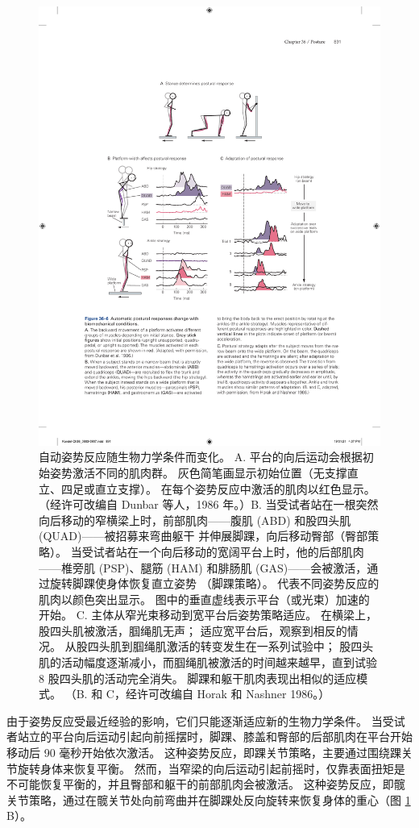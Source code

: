 \begin{figure}[htbp]
	\centering
	\includegraphics[width=0.8\linewidth]{chap36/fig_36_6}
	\caption{自动姿势反应随生物力学条件而变化。 A. 平台的向后运动会根据初始姿势激活不同的肌肉群。 灰色简笔画显示初始位置（无支撑直立、四足或直立支撑）。 在每个姿势反应中激活的肌肉以红色显示。 （经许可改编自 Dunbar 等人，1986 年。）B. 当受试者站在一根突然向后移动的窄横梁上时，前部肌肉——腹肌 (ABD) 和股四头肌 (QUAD)——被招募来弯曲躯干 并伸展脚踝，向后移动臀部（臀部策略）。 当受试者站在一个向后移动的宽阔平台上时，他的后部肌肉——椎旁肌 (PSP)、腿筋 (HAM) 和腓肠肌 (GAS)——会被激活，通过旋转脚踝使身体恢复直立姿势 （脚踝策略）。 代表不同姿势反应的肌肉以颜色突出显示。 图中的垂直虚线表示平台（或光束）加速的开始。 C. 主体从窄光束移动到宽平台后姿势策略适应。 在横梁上，股四头肌被激活，腘绳肌无声； 适应宽平台后，观察到相反的情况。 从股四头肌到腘绳肌激活的转变发生在一系列试验中； 股四头肌的活动幅度逐渐减小，而腘绳肌被激活的时间越来越早，直到试验 8 股四头肌的活动完全消失。 脚踝和躯干肌肉表现出相似的适应模式。 （B. 和 C，经许可改编自 Horak 和 Nashner 1986。）}
	\label{fig:36_6}
\end{figure}


由于姿势反应受最近经验的影响，它们只能逐渐适应新的生物力学条件。 当受试者站立的平台向后运动引起向前摇摆时，脚踝、膝盖和臀部的后部肌肉在平台开始移动后 90 毫秒开始依次激活。 这种姿势反应，即踝关节策略，主要通过围绕踝关节旋转身体来恢复平衡。 然而，当窄梁的向后运动引起前摇时，仅靠表面扭矩是不可能恢复平衡的，并且臀部和躯干的前部肌肉会被激活。 这种姿势反应，即髋关节策略，通过在髋关节处向前弯曲并在脚踝处反向旋转来恢复身体的重心（图 \ref{fig:36_6} B）。

